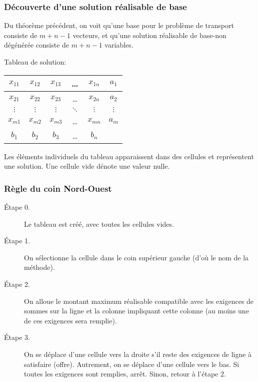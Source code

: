 \documentclass[usepdftitle=false, aspectratio=169]{beamer}
\begin{document}
\begin{frame}
\frametitle{Découverte d'une solution réalisable de base}

Du théorème précédent, on voit qu'une base pour le problème de transport consiste de $m+n-1$ vecteurs, et qu'une solution réalisable de base-non dégénérée consiste de $m+n-1$ variables.

\mbox{}

Tableau de solution:
\begin{center}
\begin{tabular}{|c|c|c|c|c|c|}
\hline
$x_{11}$ & $x_{12}$ & $x_{13}$ & \ldots & $x_{1n}$ & $a_1$ \\
\hline
$x_{21}$ & $x_{22}$ & $x_{23}$ & \ldots & $x_{2n}$ & $a_2$ \\
\hline
$\vdots$ & $\vdots$ & $\vdots$ & $\ddots$ & $\vdots$ & $\vdots$ \\
\hline
$x_{m1}$ & $x_{m2}$ & $x_{m3}$ & \ldots & $x_{mn}$ & $a_m$ \\
\hline
$b_1$ & $b_2$ & $b_3$ & \ldots & $b_n$ & \\
\hline
\end{tabular}
\end{center}

\mbox{}

Les éléments individuels du tableau apparaissent dans des cellules et représentent une solution. Une cellule vide dénote une valeur nulle.

\end{frame}

\begin{frame}
\frametitle{Règle du coin Nord-Ouest}

\begin{description}
\item[Étape 0.]
Le tableau est créé, avec toutes les cellules vides.
\item[Étape 1.]
On sélectionne la cellule dans le coin supérieur gauche (d'où le nom de la méthode).
\item[Étape 2.]
On alloue le montant maximum réalisable compatible avec les exigences de sommes sur la ligne et la colonne impliquant cette colonne (au moins une de ces exigences sera remplie).
\item[Étape 3.]
On se déplace d'une cellule vers la droite s'il reste des exigences de ligne à satisfaire (offre). Autrement, on se déplace d'une cellule vers le bas. Si toutes les exigences sont remplies, arrêt. Sinon, retour à l'étape 2.
\end{description}

\end{frame}
\end{document}
